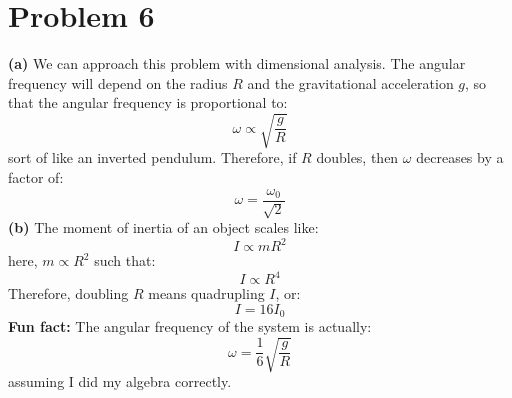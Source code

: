 \documentclass{article}
\let\oldtextbf\textbf
\renewcommand{\textbf}[1]{\oldtextbf{#1}\index{#1}}
\begin{document}
\section*{Problem 6}
\textbf{(a)} We can approach this problem with dimensional analysis. The angular frequency will depend on the radius $R$ and the gravitational acceleration $g$, so that the angular frequency is proportional to:
\begin{equation}
    \omega \propto \sqrt{\frac{g}{R}}
    \label{eq:}
\end{equation}
sort of like an inverted pendulum. Therefore, if $R$ doubles, then $\omega$ decreases by a factor of:
\begin{equation}
    \omega = \frac{\omega_0}{\sqrt{2}}
    \label{eq:}
\end{equation}
\textbf{(b)} The moment of inertia of an object scales like:
\begin{equation}
    I \propto mR^2
    \label{eq:}
\end{equation}
here, $m\propto R^2$ such that:
\begin{equation}
    I \propto R^4
    \label{eq:}
\end{equation}
Therefore, doubling $R$ means quadrupling $I$, or:
\begin{equation}
    I = 16I_0
    \label{eq:}
\end{equation}
\textbf{Fun fact:} The angular frequency of the system is actually:
\begin{equation}
    \omega = \frac{1}{6}\sqrt{\frac{g}{R}}
    \label{eq:}
\end{equation}
assuming I did my algebra correctly.
\end{document}
